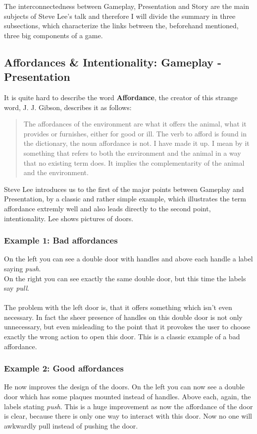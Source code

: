 \documentclass[a4paper]{article}
\begin{document}
The interconnectedness between Gameplay, Presentation and Story are the main subjects of Steve Lee's talk and therefore I will divide the summary in three subsections, which characterize the links between the, beforehand mentioned, three big components of a game.

\subsection{Affordances \& Intentionality: Gameplay - Presentation} \label{sssec:num1}

It is quite hard to describe the word \textbf{Affordance}, the creator of this strange word, J. J. Gibson, describes it as follows: 
\begin{quote}
The affordances of the environment are what it offers the animal, what it provides or furnishes, either for good or ill. The verb to afford is found in the dictionary, the noun affordance is not. I have made it up. I mean by it something that refers to both the environment and the animal in a way that no existing term does. It implies the complementarity of the animal and the environment.\cite{gibson79}
\end{quote}
Steve Lee introduces us to the first of the major points between Gameplay and Presentation, by a classic and rather simple example, which illustrates the term affordance extremly well and also leads directly to the second point, intentionality. Lee shows pictures of doors. 
\subsubsection{Example 1: Bad affordances}
On the left you can see a double door with handles and above each handle a label saying \textit{push}.\\
On the right you can see exactly the same double door, but this time the labels say \textit{pull}.\\ \\
The problem with the left door is, that it offers something which isn't even necessary. In fact the sheer presence of handles on this double door is not only unnecessary, but even misleading to the point that it provokes the user to choose exactly the wrong action to open this door. This is a classic example of a bad affordance.
\subsubsection{Example 2: Good affordances}
He now improves the design of the doors.
On the left you can now see a double door which has some plaques mounted instead of  handles. Above each, again, the labels stating \textit{push}.
This is a huge improvement as now the affordance of the door is clear, because there is only one way to interact with this door. Now no one will awkwardly pull instead of pushing the door.
\end{document}
